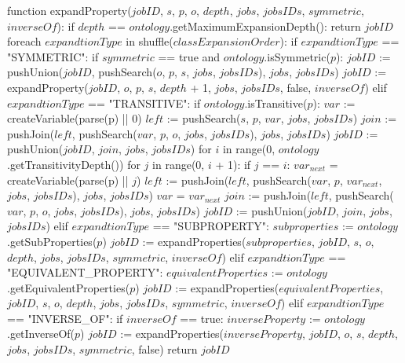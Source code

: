 function expandProperty($jobID$, $s$, $p$, $o$, $depth$, $jobs$, $jobsIDs$, $symmetric$, $inverseOf$):
    if $depth$ == $ontology$.getMaximumExpansionDepth():
        return $jobID$
    foreach $expandtionType$ in shuffle($classExpansionOrder$):
        if $expandtionType$ == "SYMMETRIC":
            if $symmetric$ == true and $ontology$.isSymmetric($p$):
                $jobID$ := pushUnion($jobID$, pushSearch($o$, $p$, $s$, $jobs$, $jobsIDs$), $jobs$, $jobsIDs$)
                $jobID$ := expandProperty($jobID$, $o$, $p$, $s$, $depth$ + 1, $jobs$, $jobsIDs$, false, $inverseOf$)
        elif $expandtionType$ == "TRANSITIVE":
            if $ontology$.isTransitive($p$):
                $var$ := createVariable(parse(p) || 0)
                $left$ := pushSearch($s$, $p$, $var$, $jobs$, $jobsIDs$)
                $join$ := pushJoin($left$, pushSearch($var$, $p$, $o$, $jobs$, $jobsIDs$), $jobs$, $jobsIDs$)
                $jobID$ := pushUnion($jobID$, $join$, $jobs$, $jobsIDs$)
                for $i$ in range(0, $ontology$.getTransitivityDepth())
                    for $j$ in range(0, $i$ + 1):
                        if $j$ == $i$: 
                            $var_{next}$ = createVariable(parse(p) || $j$)
                            $left$ := pushJoin($left$, pushSearch($var$, $p$, $var_{next}$, $jobs$, $jobsIDs$), $jobs$, $jobsIDs$)
                            $var$ = $var_{next}$
                    $join$ := pushJoin($left$, pushSearch($var$, $p$, $o$, $jobs$, $jobsIDs$), $jobs$, $jobsIDs$)
                    $jobID$ := pushUnion($jobID$, $join$, $jobs$, $jobsIDs$)
        elif $expandtionType$ == "SUBPROPERTY":
            $subproperties$ := $ontology$.getSubProperties($p$)
            $jobID$ := expandProperties($subproperties$, $jobID$, $s$, $o$, $depth$, $jobs$, $jobsIDs$, $symmetric$, $inverseOf$)
        elif $expandtionType$ == "EQUIVALENT_PROPERTY":
            $equivalentProperties$ := $ontology$.getEquivalentProperties($p$)
            $jobID$ := expandProperties($equivalentProperties$, $jobID$, $s$, $o$, $depth$, $jobs$, $jobsIDs$, $symmetric$, $inverseOf$)
        elif $expandtionType$ == "INVERSE_OF":
            if $inverseOf$ == true:
                $inverseProperty$ := $ontology$.getInverseOf($p$)
                $jobID$ := expandProperties($inverseProperty$, $jobID$, $o$, $s$, $depth$, $jobs$, $jobsIDs$, $symmetric$, false)
    return $jobID$
